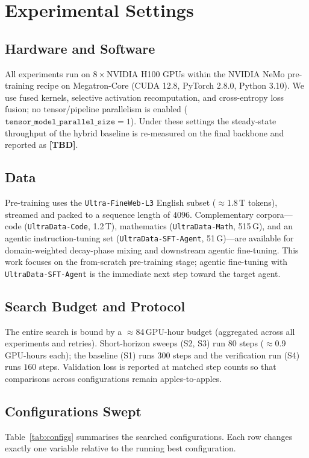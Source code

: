 \section{Experimental Settings}

\subsection{Hardware and Software}
All experiments run on $8\times$NVIDIA H100 GPUs within the NVIDIA NeMo pre-training recipe on Megatron-Core (CUDA 12.8, PyTorch 2.8.0, Python 3.10).
We use fused kernels, selective activation recomputation, and cross-entropy loss fusion; no tensor/pipeline parallelism is enabled ($\texttt{tensor\_model\_parallel\_size}=1$).
Under these settings the steady-state throughput of the hybrid baseline is re-measured on the final backbone and reported as \textbf{[TBD]}.

\subsection{Data}
Pre-training uses the \texttt{Ultra-FineWeb-L3} English subset ($\approx$1.8\,T tokens), streamed and packed to a sequence length of $4096$.
Complementary corpora---code (\texttt{UltraData-Code}, 1.2\,T), mathematics (\texttt{UltraData-Math}, 515\,G), and an agentic instruction-tuning set (\texttt{UltraData-SFT-Agent}, 51\,G)---are available for domain-weighted decay-phase mixing and downstream agentic fine-tuning.
This work focuses on the from-scratch pre-training stage; agentic fine-tuning with \texttt{UltraData-SFT-Agent} is the immediate next step toward the target agent.

\subsection{Search Budget and Protocol}
The entire search is bound by a $\approx$84\,GPU-hour budget (aggregated across all experiments and retries).
Short-horizon sweeps (S2, S3) run $80$ steps ($\approx$0.9\,GPU-hours each); the baseline (S1) runs $300$ steps and the verification run (S4) runs $160$ steps.
Validation loss is reported at matched step counts so that comparisons across configurations remain apples-to-apples.

\subsection{Configurations Swept}
Table~\ref{tab:configs} summarises the searched configurations.
Each row changes exactly one variable relative to the running best configuration.